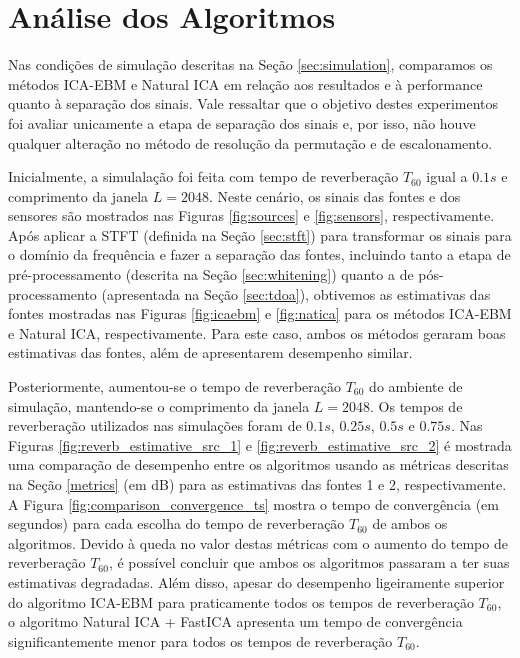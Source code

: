  \section{Análise dos Algoritmos}\label{sec:analysis}
    
    Nas condições de simulação descritas na Seção \ref{sec:simulation}, comparamos os métodos ICA-EBM e Natural ICA em relação aos resultados e à performance quanto à separação dos sinais. Vale ressaltar que o objetivo destes experimentos foi avaliar unicamente a etapa de separação dos sinais e, por isso, não houve qualquer alteração no método de resolução da permutação e de escalonamento. 
    
    Inicialmente, a simulalação foi feita com tempo de reverberação $T_{60}$ igual a $0.1s$ e comprimento da janela $L=2048$. Neste cenário, os sinais das fontes e dos sensores são mostrados nas Figuras \ref{fig:sources} e \ref{fig:sensors}, respectivamente. Após aplicar a STFT (definida na Seção \ref{sec:stft}) para transformar os sinais para o domínio da frequência e fazer a separação das fontes, incluindo tanto a etapa de pré-processamento (descrita na Seção \ref{sec:whitening}) quanto a de pós-processamento (apresentada na Seção \ref{sec:tdoa}), obtivemos as estimativas das fontes mostradas nas Figuras \ref{fig:icaebm} e \ref{fig:natica} para os métodos ICA-EBM e Natural ICA, respectivamente. Para este caso, ambos os métodos geraram boas estimativas das fontes, além de apresentarem desempenho similar.
    
    Posteriormente, aumentou-se o tempo de reverberação $T_{60}$ do ambiente de simulação, mantendo-se o comprimento da janela $L=2048$. Os tempos de reverberação utilizados nas simulações foram de $0.1s$, $0.25s$, $0.5s$ e $0.75s$. Nas Figuras \ref{fig:reverb_estimative_src_1} e \ref{fig:reverb_estimative_src_2} é mostrada uma comparação de desempenho entre os algoritmos usando as métricas descritas na Seção \ref{metrics} (em dB) para as estimativas das fontes 1 e 2, respectivamente. A Figura \ref{fig:comparison_convergence_ts} mostra o tempo de convergência (em segundos) para cada escolha do tempo de reverberação $T_{60}$ de ambos os algoritmos. Devido à queda no valor destas métricas com o aumento do tempo de reverberação $T_{60}$, é possível concluir que ambos os algoritmos passaram a ter suas estimativas degradadas. Além disso, apesar do desempenho ligeiramente superior do algoritmo ICA-EBM para praticamente todos os tempos de reverberação $T_{60}$, o algoritmo Natural ICA + FastICA apresenta um tempo de convergência significantemente menor para todos os tempos de reverberação $T_{60}$.
    
